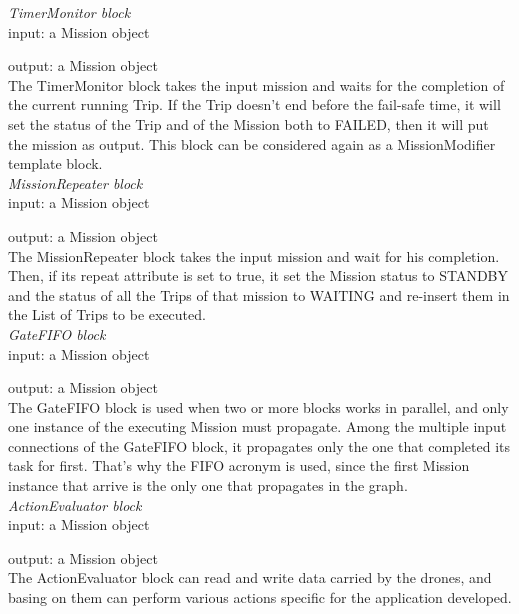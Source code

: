 \textit{TimerMonitor block}
\\

input: a Mission object

output: a Mission object
\\

The TimerMonitor block takes the input mission and waits for the completion of the current running Trip. If the Trip doesn't end before the fail-safe time, it will set the status of the Trip and of the Mission both to FAILED, then it will put the mission as output.
This block can be considered again as a MissionModifier template block.
\\

\textit{MissionRepeater block}
\\

input: a Mission object

output: a Mission object
\\

The MissionRepeater block takes the input mission and wait for his completion.
Then, if its repeat attribute is set to true, it set the Mission status to STANDBY and the status of all the Trips of that mission to WAITING and re-insert them in the List of Trips to be executed.
\\

\textit{GateFIFO block}
\\

input: a Mission object

output: a Mission object
\\

The GateFIFO block is used when two or more blocks works in parallel, and only one instance of the executing Mission must propagate.
Among the multiple input connections of the GateFIFO block, it propagates only the one that completed its task for first.
That's why the FIFO acronym is used, since the first Mission instance that arrive is the only one that propagates in the graph.
\\

\textit{ActionEvaluator block}
\\

input: a Mission object

output: a Mission object
\\

The ActionEvaluator block can read and write data carried by the drones, and basing on them can perform various actions specific for the application developed.
\\

